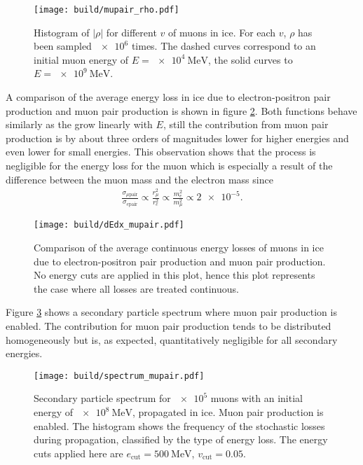 \begin{figure}
    \centering
    \texttt{[image: build/mupair\_rho.pdf]}
    \caption{Histogram of $\lvert\rho\rvert$ for different $v$ of muons in ice. For each $v$, $\rho$ has been sampled $\num{e6}$ times. The dashed curves correspond to an initial muon energy of $E=\SI{e4}{\mega\electronvolt}$, the solid curves to $E = \SI{e9}{\mega\electronvolt}$.}
    \label{fig:rho_mupair}
\end{figure}

A comparison of the average energy loss in ice due to electron-positron pair production and muon pair production is shown in figure \ref{fig:dEdx_mupair}.
Both functions behave similarly as the grow linearly with $E$, still the contribution from muon pair production is by about three orders of magnitudes lower for higher energies and even lower for small energies.
This observation shows that the process is negligible for the energy loss for the muon which is especially a result of the difference between the muon mass and the electron mass since 
\begin{align*}
	\frac{\sigma_{\mu \text{pair}}}{\sigma_{e \text{pair}}} \propto \frac{r_{\mu}^2}{r_e^2} \propto \frac{m_e^2}{m_{\mu}^2} \propto \num{2e-5}.
\end{align*}

\begin{figure}
    \centering
    \texttt{[image: build/dEdx\_mupair.pdf]}
    \caption{Comparison of the average continuous energy losses of muons in ice due to electron-positron pair production and muon pair production. No energy cuts are applied in this plot, hence this plot represents the case where all losses are treated continuous.}
    \label{fig:dEdx_mupair}
\end{figure}

Figure \ref{fig:spectrum_mupair} shows a secondary particle spectrum where muon pair production is enabled.
The contribution for muon pair production tends to be distributed homogeneously but is, as expected, quantitatively negligible for all secondary energies.

\begin{figure}
    \centering
    \texttt{[image: build/spectrum\_mupair.pdf]}
    \caption{Secondary particle spectrum for $\num{e5}$ muons with an initial energy of $\SI{e8}{\mega\electronvolt}$, propagated in ice. Muon pair production is enabled. The histogram shows the frequency of the stochastic losses during propagation, classified by the type of energy loss. The energy cuts applied here are $e_\text{cut} = \SI{500}{\mega\electronvolt}$, $v_\text{cut} = 0.05$.}
    \label{fig:spectrum_mupair}
\end{figure}

